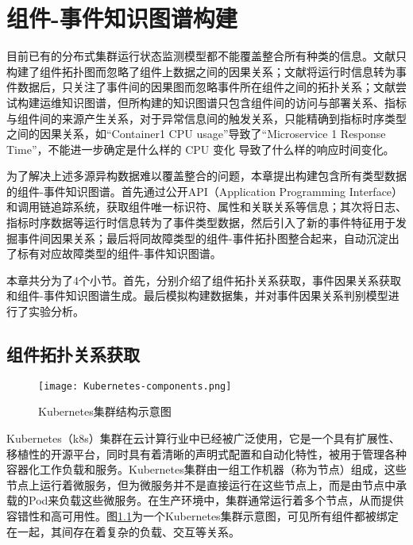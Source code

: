 \chapter{组件-事件知识图谱构建}
目前已有的分布式集群运行状态监测模型都不能覆盖整合所有种类的信息。文献\parencite{wang2019grano}只构建了组件拓扑图而忽略了组件上数据之间的因果关系；文献\parencite{nie2016mining-causality-graph}将运行时信息转为事件数据后，只关注了事件间的因果图而忽略事件所在组件之间的拓扑关系；文献\parencite{qiu2020causality-mining-knowledge-graph}尝试构建运维知识图谱，但所构建的知识图谱只包含组件间的访问与部署关系、指标与组件间的来源产生关系，对于异常信息间的触发关系，只能精确到指标时序类型之间的因果关系，如“Container1 CPU usage”导致了“Microservice 1 Response Time”，不能进一步确定是什么样的 CPU 变化
导致了什么样的响应时间变化。

为了解决上述多源异构数据难以覆盖整合的问题，本章提出构建包含所有类型数据的组件-事件知识图谱。首先通过公开API（Application Programming Interface）和调用链追踪系统，获取组件唯一标识符、属性和关联关系等信息；其次将日志、指标时序数据等运行时信息转为了事件类型数据，然后引入了新的事件特征用于发掘事件间因果关系；最后将同故障类型的组件-事件拓扑图整合起来，自动沉淀出了标有对应故障类型的组件-事件知识图谱。

本章共分为了4个小节。首先，分别介绍了组件拓扑关系获取，事件因果关系获取和组件-事件知识图谱生成。最后模拟构建数据集，并对事件因果关系判别模型进行了实验分析。

\section{组件拓扑关系获取}
\begin{figure}[htbp]
    \centering
    \texttt{[image: Kubernetes-components.png]}
    \caption{Kubernetes集群结构示意图\label{Kubernetes-components}}
\end{figure}
Kubernetes（k8s）集群\cite{bernstein2014containers}在云计算行业中已经被广泛使用，它是一个具有扩展性、移植性的开源平台，同时具有着清晰的声明式配置和自动化特性，被用于管理各种容器化工作负载和服务。Kubernetes集群由一组工作机器（称为节点）组成，这些节点上运行着微服务，但为微服务并不是直接运行在这些节点上，而是由节点中承载的Pod来负载这些微服务。在生产环境中，集群通常运行着多个节点，从而提供容错性和高可用性。图\ref{Kubernetes-components}为一个Kubernetes集群示意图，可见所有组件都被绑定在一起，其间存在着复杂的负载、交互等关系。


